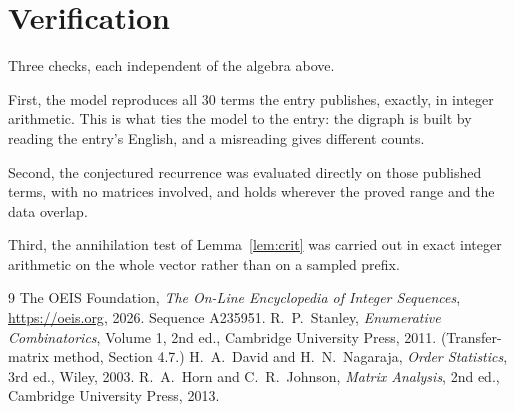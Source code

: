 \documentclass[11pt,a4paper]{article}
\theoremstyle{plain}
\theoremstyle{definition}
\begin{document}
\section{Verification}

Three checks, each independent of the algebra above.

First, the model reproduces all $30$ terms the entry publishes, exactly, in integer
arithmetic. This is what ties the model to the entry: the digraph is built by reading the
entry's English, and a misreading gives different counts.

Second, the conjectured recurrence was evaluated directly on those published terms, with no
matrices involved, and holds wherever the proved range and the data overlap.

Third, the annihilation test of Lemma~\ref{lem:crit} was carried out in exact integer
arithmetic on the whole vector rather than on a sampled prefix.

\begin{thebibliography}{9}
 The OEIS Foundation, \emph{The On-Line Encyclopedia of Integer
Sequences}, \url{https://oeis.org}, 2026. Sequence A235951.
 R.~P.~Stanley, \emph{Enumerative Combinatorics}, Volume 1, 2nd ed.,
Cambridge University Press, 2011. (Transfer-matrix method, Section 4.7.)
 H.~A.~David and H.~N.~Nagaraja, \emph{Order Statistics}, 3rd ed., Wiley,
2003.
 R.~A.~Horn and C.~R.~Johnson, \emph{Matrix Analysis}, 2nd ed., Cambridge
University Press, 2013.
\end{thebibliography}
\end{document}
